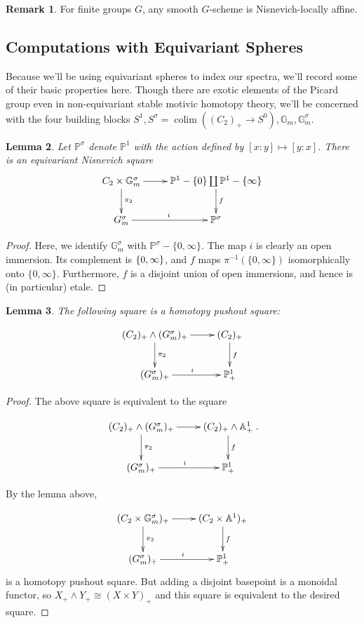 \documentclass[draftthesis,tocnosub,noragright,centerchapter,10pt]{uiucthesis2009}
\newcommand{\mbb}{\mathbb}
\DeclareMathOperator*{\colim}{colim}
\theoremstyle{plain}
\newtheorem{lemma}{Lemma}
\theoremstyle{definition}
\newtheorem{remark}[lemma]{Remark}
\begin{document}
\begin{remark}
For finite groups $G$, any smooth $G$-scheme is Nisnevich-locally
affine. 
\end{remark}

\subsection{Computations with Equivariant Spheres}

Because we'll be using equivariant spheres to index our spectra, we'll
record some of their basic properties here. Though there are exotic
elements of the Picard group even in non-equivariant stable motivic
homotopy theory, we'll be concerned with the four building blocks
$S^1, S^\sigma = \colim ((C_2)_+ \rightarrow S^0), \mbb G_m, \mbb
G_m^{\sigma}$.

\begin{lemma}
Let $\mbb P^\sigma$ denote $\mbb P^1$ with the action defined by $[x:y] \mapsto
[y:x]$. There is an equivariant Nisnevich square
\[
\xymatrix{C_2\times \mbb G_m^\sigma \ar[r]\ar[d]^{\pi_2} & \mbb P^1 -
  \{0\} \coprod \mbb P^1 - \{\infty\} \ar[d]^f \\ G_m^\sigma \ar[r]^i & \mbb P^\sigma}
\]
\end{lemma} 

\begin{proof}
Here, we identify $\mbb G_m^\sigma$ with $\mbb P^\sigma -
\{0,\infty\}$. The map $i$ is clearly an open immersion. Its
complement is $\mbb \{0,\infty\}$, and $f$ maps
$\pi^{-1}(\{0,\infty\})$ isomorphically onto
$\{0,\infty\}$. Furthermore, $f$ is a disjoint union of open
immersions, and hence is (in particular) etale. 
\end{proof}

\begin{lemma}
The following square is a homotopy pushout square:

\[
\xymatrix{(C_2)_+\wedge \mbb (G_m^\sigma)_+ \ar[r]\ar[d]^{\pi_2} &
  (C_2)_+ \ar[d]^f \\ (G_m^\sigma)_+ \ar[r]^i & \mbb P_+^1}
\]
\end{lemma}

\begin{proof}
The above square is equivalent to the square

\[
\xymatrix{(C_2)_+\wedge \mbb (G_m^\sigma)_+ \ar[r]\ar[d]^{\pi_2} &
  (C_2)_+ \wedge \mbb A^1_+ \ar[d]^f \\ (G_m^\sigma)_+ \ar[r]^i & \mbb P_+^1}.
\] 

By the lemma above, 

\[
\xymatrix{(C_2\times \mbb G_m^\sigma)_+ \ar[r]\ar[d]^{\pi_2} & (C_2
  \times \mbb A^1)_+\ar[d]^f \\ (G_m^\sigma)_+ \ar[r]^i & \mbb P_+^1}
\]
is a homotopy pushout square. But adding a disjoint basepoint is a
monoidal functor, so $X_+ \wedge Y_+ \cong (X \times Y)_+$ and this
square is equivalent to the desired square.
\end{proof}
\end{document}
